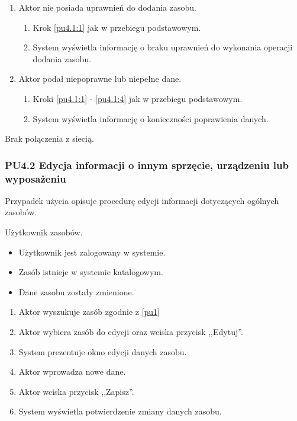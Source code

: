 \begin{enumerate}
\item Aktor nie posiada uprawnień do dodania zasobu.
	\begin{enumerate}[label*=\arabic*.]
		\item Krok \ref{pu4.1:1} jak w przebiegu podstawowym.
		\item System wyświetla informację o braku uprawnień do wykonania operacji dodania zasobu.
	\end{enumerate}
\item Aktor podał niepoprawne lub niepełne dane.
	\begin{enumerate}[label*=\arabic*.]
		\item Kroki \ref{pu4.1:1} - \ref{pu4.1:4} jak w przebiegu podstawowym.
		\item System wyświetla informację o konieczności poprawienia danych.
	\end{enumerate}
\end{enumerate}

Brak połączenia z siecią.

\subsubsection{PU4.2 Edycja informacji o innym sprzęcie, urządzeniu lub wyposażeniu}

Przypadek użycia opisuje procedurę edycji informacji dotyczących ogólnych zasobów.

Użytkownik zasobów.

\begin{itemize}
\item Użytkownik jest zalogowany w systemie.
\item Zasób istnieje w systemie katalogowym.
\end{itemize}

\begin{itemize}
\item Dane zasobu zostały zmienione.
\end{itemize}

\begin{enumerate}
\item \label{pu4.2:1} Aktor wyszukuje zasób zgodnie z \ref{pu1}
\item \label{pu4.2:2} Aktor wybiera zasób do edycji oraz wciska przycisk ,,Edytuj''.
\item System prezentuje okno edycji danych zasobu.
\item Aktor wprowadza nowe dane.
\item \label{pu4.2:5} Aktor wciska przycisk ,,Zapisz''.
\item System wyświetla potwierdzenie zmiany danych zasobu.
\end{enumerate}

